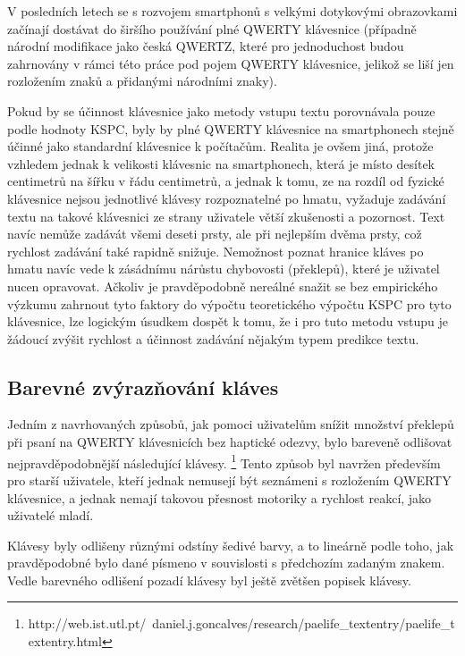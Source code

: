 \documentclass[a4paper,11pt]{article}
\begin{document}
V posledních letech se s rozvojem smartphonů s velkými dotykovými obrazovkami začínají dostávat do širšího používání plné QWERTY klávesnice (případně národní modifikace jako česká QWERTZ, které pro jednoduchost budou zahrnovány v rámci této práce pod pojem QWERTY klávesnice, jelikož se liší jen rozložením znaků a přidanými národními znaky). 

Pokud by se účinnost klávesnice jako metody vstupu textu porovnávala pouze podle hodnoty KSPC, byly by plné QWERTY klávesnice na smartphonech stejně účinné jako standardní klávesnice k počítačům. Realita je ovšem jiná, protože vzhledem jednak k velikosti klávesnic na smartphonech, která je místo desítek centimetrů na šířku v řádu centimetrů, a jednak k tomu, ze na rozdíl od fyzické klávesnice nejsou jednotlivé klávesy rozpoznatelné po hmatu, vyžaduje zadávání textu na takové klávesnici ze strany uživatele větší zkušenosti a pozornost. Text navíc nemůže zadávát všemi deseti prsty, ale při nejlepším dvěma prsty, což rychlost zadávání také rapidně snižuje. Nemožnost poznat hranice kláves po hmatu navíc vede k zásádnímu nárůstu chybovosti (překlepů), které je uživatel nucen opravovat. Ačkoliv je pravděpodobně nereálné snažit se bez empirického výzkumu zahrnout tyto faktory do výpočtu teoretického výpočtu KSPC pro tyto klávesnice, lze logickým úsudkem dospět k tomu, že i pro tuto metodu vstupu je žádoucí zvýšit rychlost a účinnost zadávání nějakým typem predikce textu.

\subsection{Barevné zvýrazňování kláves}

Jedním z navrhovaných způsobů, jak pomoci uživatelům snížit množství překlepů při psaní na QWERTY klávesnicích bez haptické odezvy, bylo bareveně odlišovat nejpravděpodobnější následující klávesy. \footnote{http://web.ist.utl.pt/~daniel.j.goncalves/research/paelife\_textentry/paelife\_textentry.html} Tento způsob byl navržen především pro starší uživatele, kteří jednak nemusejí být seznámeni s rozložením QWERTY klávesnice, a jednak nemají takovou přesnost motoriky a rychlost reakcí, jako uživatelé mladí. 

Klávesy byly odlišeny různými odstíny šedivé barvy, a to lineárně podle toho, jak pravděpodobné bylo dané písmeno v souvislosti s předchozím zadaným znakem. Vedle barevného odlišení pozadí klávesy byl ještě zvětšen popisek klávesy.

\end{document}
